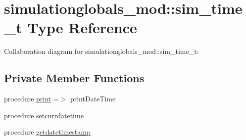 \hypertarget{structsimulationglobals__mod_1_1sim__time__t}{}\section{simulationglobals\+\_\+mod\+:\+:sim\+\_\+time\+\_\+t Type Reference}
\label{structsimulationglobals__mod_1_1sim__time__t}


Collaboration diagram for simulationglobals\+\_\+mod\+:\+:sim\+\_\+time\+\_\+t\+:
\subsection*{Private Member Functions}
\begin{DoxyCompactItemize}
\item 
procedure \mbox{\hyperlink{structsimulationglobals__mod_1_1sim__time__t_a24aa321faaaf3f94343ae2161cf873cd}{print}} =$>$ print\+Date\+Time
\item 
procedure \mbox{\hyperlink{structsimulationglobals__mod_1_1sim__time__t_adb083c01d6e79f6bdc715a4cd85a155d}{setcurrdatetime}}
\item 
procedure \mbox{\hyperlink{structsimulationglobals__mod_1_1sim__time__t_ada67e9a9bc56121febffba51622be61e}{getdatetimestamp}}
\end{DoxyCompactItemize}
